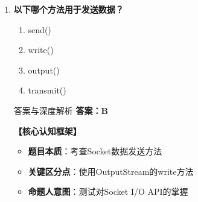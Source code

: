 \documentclass[12pt, a4paper]{ctexart}
\begin{document}
\begin{enumerate}[label=\textbf{\arabic*.}]
\begin{bluebox}{答案与深度解析}
		      \textbf{【应背诵知识点（命题人思维版）】}
		      \begin{enumerate}[leftmargin=*, nosep]
			      \item \textbf{Socket通信流程}：
			            \begin{itemize}[label={}, nosep]
				            \item 服务器：ServerSocket监听 → accept() → 获得Socket
				            \item 客户端：new Socket() → 连接服务器
			            \end{itemize}

			      \item \textbf{高频陷阱清单}：
			            \begin{itemize}[label={}, nosep]
				            \item 陷阱1：网络编程必须捕获IOException
			            \end{itemize}
		      \end{enumerate}

		      \textbf{【命题趋势与实战策略】}

		      \textbf{考场秒杀技巧}：Socket编程异常处理是必须的
	      \end{bluebox}

	\item \textbf{以下哪个方法用于发送数据？}
	      \begin{enumerate}[label=\Alph*.]
		      \item send()
		      \item write()
		      \item output()
		      \item transmit()
	      \end{enumerate}

	      \begin{bluebox}{答案与深度解析}
		      \textbf{答案：B}

		      \textbf{【核心认知框架】}
		      \begin{itemize}[label={}, leftmargin=*, nosep]
			      \item \textbf{题目本质}：考查Socket数据发送方法
			      \item \textbf{关键区分点}：使用OutputStream的write方法
			      \item \textbf{命题人意图}：测试对Socket I/O API的掌握
		      \end{itemize}


\end{bluebox}
\end{enumerate}
\end{document}
